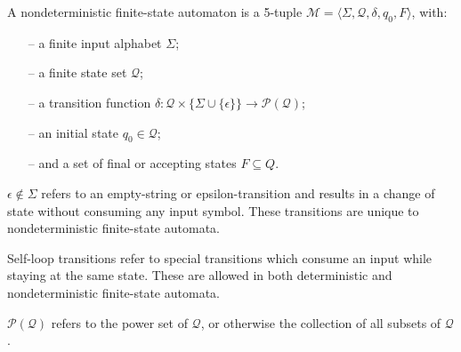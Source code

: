 \begin{definition}
  \label{def:nd-fsa}
  A nondeterministic finite-state automaton is a 5-tuple $\mathcal{M} = \langle
  \Sigma, \mathcal{Q}, \delta, q_0, F \rangle$, with:
  \begin{itemize}
    \itemsep0em
    \item[--] a finite input alphabet $\Sigma$;
    \item[--] a finite state set $\mathcal{Q}$;
    \item[--] a transition function $\delta: \mathcal{Q} \times \{\Sigma \cup
    \{\epsilon\}\} \rightarrow \mathcal{P}(\mathcal{Q})$;
    \item[--] an initial state $q_0 \in \mathcal{Q}$;
    \item[--] and a set of final or accepting states $F \subseteq Q$.
  \end{itemize}

  \begin{remark}
    $\epsilon \notin \Sigma$ refers to an empty-string or epsilon-transition
    and results in a change of state without consuming any input
    symbol. These transitions are unique to nondeterministic finite-state automata.
  \end{remark}

  \begin{remark}
    Self-loop transitions refer to special transitions which consume an input
    while staying at the same state. These are allowed in both deterministic and
    nondeterministic finite-state automata.
  \end{remark}
  
  \begin{remark}
    $\mathcal{P}(\mathcal{Q})$ refers to the power set of $\mathcal{Q}$, or
    otherwise the collection of all subsets of $\mathcal{Q}$.
  \end{remark}
\end{definition}

